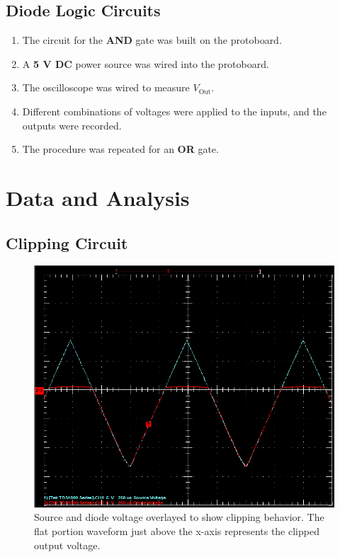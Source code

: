\documentclass[twocolumn,english]{IEEEtran}
\begin{document}
\subsection{Diode Logic Circuits}
  \begin{enumerate}
   \item The circuit for the \textbf{AND} gate was built on the protoboard.
   \item A \textbf{5 V DC} power source was wired into the protoboard.
   \item The oscilloscope was wired to measure $V_{\text{Out}}$.
   \item Different combinations of voltages were applied to the inputs, and the outputs were recorded.
   \item The procedure was repeated for an \textbf{OR} gate.
  \end{enumerate}

\section{Data and Analysis}


\subsection{\textbf{Clipping Circuit}}

\begin{figure}[H]
  \begin{centering}
  \begin{center}
  \includegraphics[width=\linewidth]{./Circuit_1.png}
  \caption{Source and diode voltage overlayed to show clipping behavior. The flat portion waveform just above the x-axis represents the clipped output voltage.}
  \label{fig:circuit_1}
  \end{center}
  \par\end{centering}
\end{figure}
\end{document}
